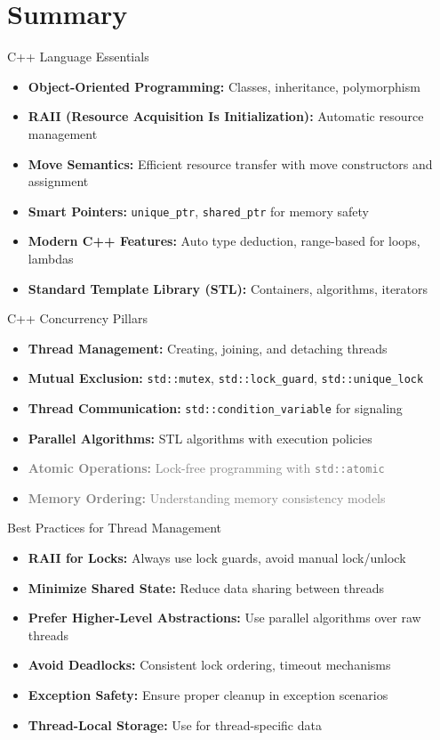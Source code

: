 \section{Summary}

\begin{frame}{C++ Language Essentials}
	\begin{itemize}
		\item \textbf{Object-Oriented Programming:} Classes, inheritance, polymorphism
		\item \textbf{RAII (Resource Acquisition Is Initialization):} Automatic resource management
		\item \textbf{Move Semantics:} Efficient resource transfer with move constructors and assignment
		\item \textbf{Smart Pointers:} \texttt{unique\_ptr}, \texttt{shared\_ptr} for memory safety
		\item \textbf{Modern C++ Features:} Auto type deduction, range-based for loops, lambdas
		\item \textbf{Standard Template Library (STL):} Containers, algorithms, iterators
	\end{itemize}
\end{frame}

\begin{frame}{C++ Concurrency Pillars}
	\begin{itemize}
		\item \textbf{Thread Management:} Creating, joining, and detaching threads
		\item \textbf{Mutual Exclusion:} \texttt{std::mutex}, \texttt{std::lock\_guard}, \texttt{std::unique\_lock}
		\item \textbf{Thread Communication:} \texttt{std::condition\_variable} for signaling
		\item \textbf{Parallel Algorithms:} STL algorithms with execution policies
		\item \textcolor{gray}{\textbf{Atomic Operations:} Lock-free programming with \texttt{std::atomic}}
		\item \textcolor{gray}{\textbf{Memory Ordering:} Understanding memory consistency models}
	\end{itemize}
\end{frame}

\begin{frame}{Best Practices for Thread Management}
	\begin{itemize}
		\item \textbf{RAII for Locks:} Always use lock guards, avoid manual lock/unlock
		\item \textbf{Minimize Shared State:} Reduce data sharing between threads
		\item \textbf{Prefer Higher-Level Abstractions:} Use parallel algorithms over raw threads
		\item \textbf{Avoid Deadlocks:} Consistent lock ordering, timeout mechanisms
		\item \textbf{Exception Safety:} Ensure proper cleanup in exception scenarios
		\item \textbf{Thread-Local Storage:} Use for thread-specific data
	\end{itemize}
\end{frame}

